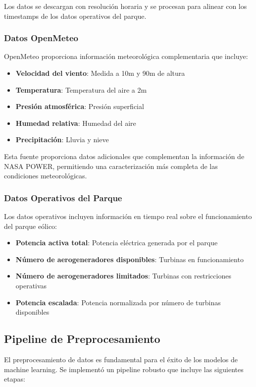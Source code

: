 \documentclass[conference]{IEEEtran}
\begin{document}
	Los datos se descargan con resolución horaria y se procesan para alinear con los timestamps de los datos operativos del parque.
	
	\subsubsection{Datos OpenMeteo}
	OpenMeteo proporciona información meteorológica complementaria que incluye:
	\begin{itemize}
		\item \textbf{Velocidad del viento}: Medida a 10m y 90m de altura
		\item \textbf{Temperatura}: Temperatura del aire a 2m
		\item \textbf{Presión atmosférica}: Presión superficial
		\item \textbf{Humedad relativa}: Humedad del aire
		\item \textbf{Precipitación}: Lluvia y nieve
	\end{itemize}
	
	Esta fuente proporciona datos adicionales que complementan la información de NASA POWER, permitiendo una caracterización más completa de las condiciones meteorológicas.
	
	\subsubsection{Datos Operativos del Parque}
	Los datos operativos incluyen información en tiempo real sobre el funcionamiento del parque eólico:
	\begin{itemize}
		\item \textbf{Potencia activa total}: Potencia eléctrica generada por el parque
		\item \textbf{Número de aerogeneradores disponibles}: Turbinas en funcionamiento
		\item \textbf{Número de aerogeneradores limitados}: Turbinas con restricciones operativas
		\item \textbf{Potencia escalada}: Potencia normalizada por número de turbinas disponibles
	\end{itemize}
	
	\subsection{Pipeline de Preprocesamiento}
	El preprocesamiento de datos es fundamental para el éxito de los modelos de machine learning. Se implementó un pipeline robusto que incluye las siguientes etapas:
	
\end{document}
